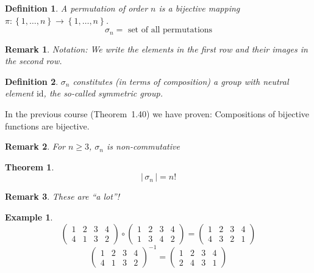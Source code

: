 \documentclass[a4paper,landscape,twocolumn]{article}
\newcommand\set[1]{\left\{#1\right\}}
\newcommand\card[1]{\left|\,#1\,\right|}
\newtheorem{theorem}{Theorem}
\newtheorem{defi}{Definition}
\newtheorem{ex}{Example}
\newtheorem{rem}{Remark}
\begin{document}
\begin{defi}
  \label{defi-7.8}
  A permutation of order $n$ is a bijective mapping $\pi: \set{1, \ldots, n} \to \set{1, \ldots, n}$.
  \[ \sigma_n = \text{ set of all permutations} \]
\end{defi}
\begin{rem}
  Notation:
  We write the elements in the first row and their images in the second row.
\end{rem}
\begin{defi}
  \label{defi-7.9}
  $\sigma_n$ constitutes (in terms of composition) a group with neutral element $\text{id}$,
  the so-called symmetric group.
\end{defi}

In the previous course (Theorem~1.40) we have proven: Compositions of bijective functions are bijective.
\begin{rem}
  For $n \geq 3$, $\sigma_n$ is non-commutative
\end{rem}
\begin{theorem}
  \label{satz-7.10}
  \[ \card{\sigma_n} = n! \]
\end{theorem}
\begin{rem}
  These are \enquote{a lot}!
\end{rem}
\begin{ex}
  \label{example-7.11}
  \[
    \begin{pmatrix}
      1 & 2 & 3 & 4 \\
      4 & 1 & 3 & 2
    \end{pmatrix} \circ \begin{pmatrix}
      1 & 2 & 3 & 4 \\
      1 & 3 & 4 & 2
    \end{pmatrix}
    = \begin{pmatrix}
      1 & 2 & 3 & 4 \\
      4 & 3 & 2 & 1
    \end{pmatrix}
  \] \[
    \begin{pmatrix}
      1 & 2 & 3 & 4 \\
      4 & 1 & 3 & 2
    \end{pmatrix}^{-1}
    = \begin{pmatrix}
      1 & 2 & 3 & 4 \\
      2 & 4 & 3 & 1
    \end{pmatrix}
  \]
\end{ex}
\end{document}
